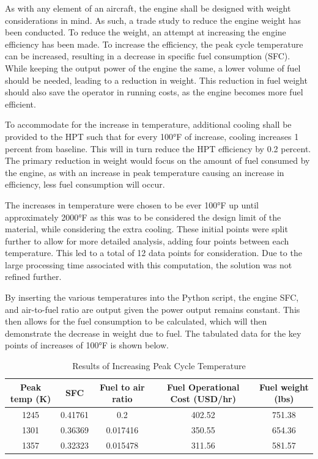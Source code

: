 \documentclass[12pt, letter]{report}
\begin{document}
As with any element of an aircraft, the engine shall be designed with weight considerations in mind. As such, a trade study to reduce the engine weight has been conducted. To reduce the weight, an attempt at increasing the engine efficiency has been made. To increase the efficiency, the peak cycle temperature can be increased, resulting in a decrease in specific fuel consumption (SFC). While keeping the output power of the engine the same, a lower volume of fuel should be needed, leading to a reduction in weight. This reduction in fuel weight should also save the operator in running costs, as the engine becomes more fuel efficient.

To accommodate for the increase in temperature, additional cooling shall be provided to the HPT such that for every 100°F of increase, cooling increases 1 percent from baseline. This will in turn reduce the HPT efficiency by 0.2 percent. The primary reduction in weight would focus on the amount of fuel consumed by the engine, as with an increase in peak temperature causing an increase in efficiency, less fuel consumption will occur. 

The increases in temperature were chosen to be ever 100°F up until approximately 2000°F as this was to be considered the design limit of the material, while considering the extra cooling. These initial points were split further to allow for more detailed analysis, adding four points between each temperature. This led to a total of 12 data points for consideration. Due to the large processing time associated with this computation, the solution was not refined further. 

By inserting the various temperatures into the Python script, the engine SFC, and air-to-fuel ratio are output given the power output remains constant. This then allows for the fuel consumption to be calculated, which will then demonstrate the decrease in weight due to fuel. The tabulated data for the key points of increases of 100°F is shown below.

\begin{table}[H]
\centering
\caption{Results of Increasing Peak Cycle Temperature}
\begin{tabular}{|c|c|c|c|c|}
\hline
\textbf{Peak temp (K)} & \textbf{SFC} & \textbf{Fuel to air ratio} & \textbf{Fuel Operational Cost (USD/hr)} & \textbf{Fuel weight (lbs)} \\ \hline
1245                    & 0.41761      & 0.2                         & 402.52                                 & 751.38                     \\ \hline
1301                    & 0.36369      & 0.017416                    & 350.55                                 & 654.36                     \\ \hline
1357                    & 0.32323      & 0.015478                    & 311.56                                 & 581.57                     \\ \hline
\end{tabular}

\end{table}
\end{document}
